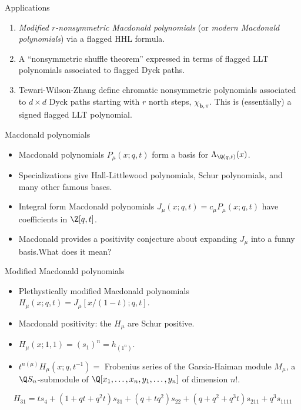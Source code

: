 \documentclass[dvipsnames]{beamer}
\newcommand{\xx}{x}%
\newcommand{\Gcal}{{\mathcal G}}
\newcommand{\bb}{{\mathbf b}}
\theoremstyle{definition}
\newcounter{c}
\begin{document}
\begin{frame}{Applications}
  \begin{enumerate}
  \item \emph{Modified \(r\)-nonsymmetric Macdonald
      polynomials} (or \emph{modern Macdonald polynomials})
    via a flagged HHL formula.\pause
  \item A ``nonsymmetric shuffle theorem''
    expressed in terms of flagged LLT polynomials associated to
    flagged Dyck paths.\pause
  \item Tewari-Wilson-Zhang define chromatic nonsymmetric polynomials
    associated to \(d \times d\) Dyck paths starting with \(r\) north
    steps, \(\chi_{\bb,\pi}\). This is (essentially) a signed
    flagged LLT polynomial.
  \end{enumerate}
\end{frame}
\begin{frame}{Macdonald polynomials}
  \begin{itemize}
\item Macdonald polynomials  $P_\mu(\xx;q,t)$ form a basis for  $\Lambda_{\Q(q,t)}(\xx)$.\pause
\item Specializations give Hall-Littlewood polynomials, Schur
  polynomials, and many other famous bases.\pause
\item Integral form Macdonald polynomials $J_{\mu}(\xx;q, t) = c_\mu P_\mu(\xx;q,t)$ have coefficients in  $\Z[q,t]$.\pause
\item Macdonald provides a positivity conjecture about expanding
  \(J_\mu\) into a funny basis.\pause What does it mean?
\end{itemize}
\end{frame}
\begin{frame}{Modified Macdonald polynomials}
\begin{itemize}
\item Plethystically modified Macdonald polynomials
\mbox{\quad \quad \quad \quad \quad \quad \quad $H_\mu(\xx;q,t) = J_\mu[\xx/(1-t);q,t]$.}
\item Macdonald positivity: the  $H_\mu$ are Schur positive.\pause
\item $H_\mu(\xx;1,1) = (s_1)^n = h_{(1^n)}$.\pause
\item $t^{n(\mu)} H_\mu(\xx;q,t^{-1}) = $ Frobenius series of the
Garsia-Haiman module  $M_\mu$, a $\Q S_n$-submodule of
 $\Q[x_1,\dots, x_n, y_1,\dots, y_n]$ of dimension  $n!$.\pause
\end{itemize}
\vspace{0.5cm}
\[
H_{31} = ts_4 + (1+qt+q^2t)s_{31} + (q+tq^2)s_{22}+(q+q^2+q^3t)s_{211}+q^3s_{1111}
\]
\end{frame}
\end{document}

